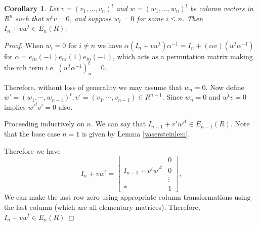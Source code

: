 \documentclass[12pt]{report}
\numberwithin{equation}{section}
\newcounter{dummy} \numberwithin{dummy}{section}
\newtheorem{corollary}[dummy]{Corollary}
\begin{document}
		\begin{corollary}\label{corofvaserstein}
		Let $v = (v_1,\ldots,v_n)^t$ and $w = (w_1,\ldots,w_n)^t$ be column vectors in $R^n$ such that $w^tv = 0$, and suppose $w_i = 0$ for some $i \leq n$. Then $I_n + vw^t \in E_n(R)$.
		\end{corollary}
		\begin{proof}
			When $w_i =0$ for $i \neq n $ we have $\alpha(I_n+vw^t)\alpha^{-1}=I_n+(\alpha v)(w^t\alpha^{-1})$for $\alpha=e_{in}(-1)e_{ni}(1)e_{in}(-1)$, which acts as a permutation matrix making the nth term i.e. $(w^t \alpha^{-1})^t_n=0$.
			
			Therefore, without loss of generality we may assume that $w_n=0$. Now define $w'=(w_1,\cdots, w_{n-1})^t, v'=(v_1, \cdots, v_{n-1}) \in R^{n-1}$. Since $w_n=0$ and $w^tv=0 $ implies $w'^tv'=0$ also. 
			
			Proceeding inductively on $n$. We can say that $I_{n-1}+v'w'^t \in E_{n-1}(R)$. Note that the base case $n=1$ is given by Lemma \ref{vasersteinlem}.
			
			Therefore we have  \[
			I_n + v w^t = \begin{bmatrix}  & 0 \\ 
			I_{n-1} + v' w'^t	& 0\\
				 & \vdots \\ \hline
				* & 1 \end{bmatrix},
			\]
			We can make the last row zero using appropriate column transformations using the last column (which are all elementary matrices). Therefore, $I_n +vw^t \in E_n(R)$
		\end{proof}
		
\end{document}
